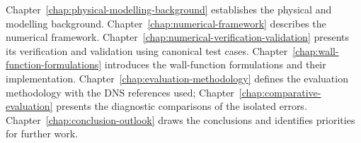 \label{sec:introduction:thesis-structure}
Chapter~\ref{chap:physical-modelling-background} establishes the physical and modelling background. Chapter~\ref{chap:numerical-framework} describes the numerical framework. Chapter~\ref{chap:numerical-verification-validation} presents its verification and validation using canonical test cases. Chapter~\ref{chap:wall-function-formulations} introduces the wall-function formulations and their implementation. Chapter~\ref{chap:evaluation-methodology} defines the evaluation methodology with the DNS references used; Chapter~\ref{chap:comparative-evaluation} presents the diagnostic comparisons of the isolated errors. Chapter~\ref{chap:conclusion-outlook} draws the conclusions and identifies priorities for further work.
